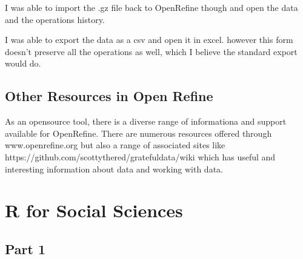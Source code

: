 \documentclass{article}
\begin{document}
I was able to import the .gz file back to OpenRefine though and open the data and the operations history.

I was able to export the data as a csv and open it in excel. however this form doesn't preserve all the operations as well, which I believe the standard export would do.


\subsection{Other Resources in Open Refine}

As an opensource tool, there is a diverse range of informationa and support available for OpenRefine. 
There are numerous resources offered through www.openrefine.org but also a range of associated sites like https://github.com/scottythered/gratefuldata/wiki which has useful and interesting information about data and working with data.


\section{R for Social Sciences}
\subsection{Part 1}
\end{document}
